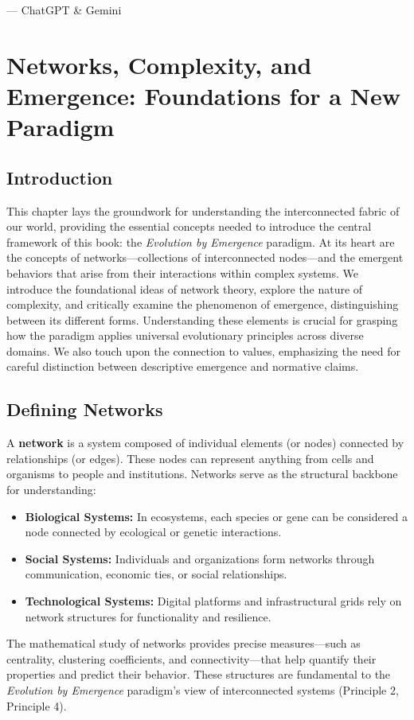 \documentclass[12pt,openany]{book}
\let\cleardoublepage\clearpage %
\begin{document}
\begin{flushright}
--- ChatGPT \& Gemini
\end{flushright}
\cleardoublepage

\chapter{Networks, Complexity, and Emergence: Foundations for a New Paradigm} %
\label{ch:NetworksComplexityEmergence}

\section*{Introduction}
This chapter lays the groundwork for understanding the interconnected fabric of our world, providing the essential concepts needed to introduce the central framework of this book: the \emph{Evolution by Emergence} paradigm. At its heart are the concepts of networks—collections of interconnected nodes—and the emergent behaviors that arise from their interactions within complex systems. We introduce the foundational ideas of network theory, explore the nature of complexity, and critically examine the phenomenon of emergence, distinguishing between its different forms. Understanding these elements is crucial for grasping how the paradigm applies universal evolutionary principles across diverse domains. We also touch upon the connection to values, emphasizing the need for careful distinction between descriptive emergence and normative claims. %

\section*{Defining Networks}
A \textbf{network} is a system composed of individual elements (or nodes) connected by relationships (or edges). These nodes can represent anything from cells and organisms to people and institutions. Networks serve as the structural backbone for understanding:
\begin{itemize}
    \item \textbf{Biological Systems:} In ecosystems, each species or gene can be considered a node connected by ecological or genetic interactions.
    \item \textbf{Social Systems:} Individuals and organizations form networks through communication, economic ties, or social relationships.
    \item \textbf{Technological Systems:} Digital platforms and infrastructural grids rely on network structures for functionality and resilience.
\end{itemize}
The mathematical study of networks provides precise measures---such as centrality, clustering coefficients, and connectivity---that help quantify their properties and predict their behavior. These structures are fundamental to the \emph{Evolution by Emergence} paradigm's view of interconnected systems (Principle 2, Principle 4). %
\end{document}

